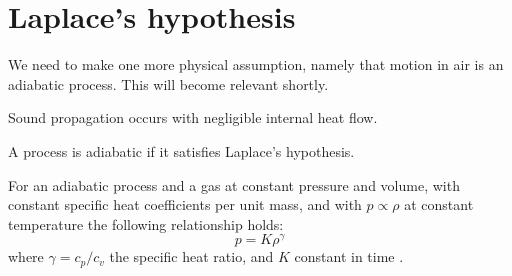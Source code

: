\section{Laplace's hypothesis}\label{ss:laplace_hypothesis}
We need to make one more physical assumption, namely that motion in air is an adiabatic process. This will become relevant shortly.
    \begin{hypothesis}
        Sound propagation occurs with negligible internal heat flow.
    \end{hypothesis}
    \begin{defn}\label{defn:adiabatic}
        A process is adiabatic if it satisfies Laplace's hypothesis.
    \end{defn} \par
%
For an adiabatic process and a gas at constant pressure and volume, with constant specific heat coefficients per unit mass, and with $p \propto \rho$ at constant temperature the following relationship holds:
    \begin{equation}\label{eq:adiabatic_condition}
        p = K \rho ^ \gamma
    \end{equation}
where $\gamma = c_p/c_v$ the specific heat ratio, and $K$ constant in time \cite[$\S$1.4.1]{pierce19acoustics}.
%
